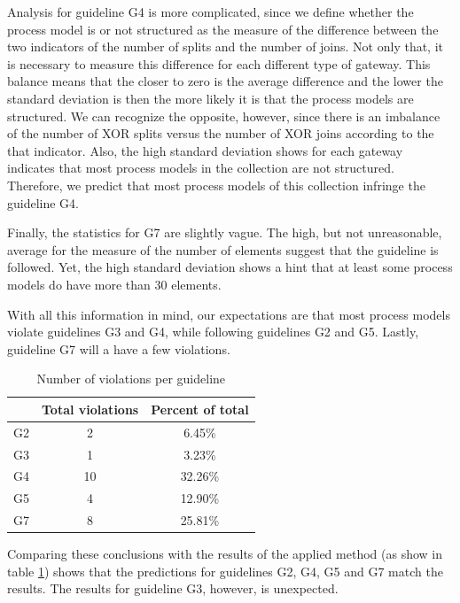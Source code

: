 \documentclass[a4paper,twoside]{article}
\begin{document}
Analysis for guideline G4 is more complicated, since we define whether the process model is or not structured as the measure of the difference between the two indicators of the number of splits and the number of joins. Not only that, it is necessary to measure this difference for each different type of gateway. This balance means that the closer to zero is the average difference and the lower the standard deviation is then the more likely it is that the process models are structured.  We can recognize the opposite, however, since there is an imbalance of the number of XOR splits versus the number of XOR joins according to the that indicator. Also, the high standard deviation shows for each gateway indicates that most process models in the collection are not structured. Therefore, we predict that most process models of this collection infringe the guideline G4.

Finally, the statistics for G7 are slightly vague. The high, but not unreasonable, average for the measure of the number of elements suggest that the guideline is followed. Yet, the high standard deviation shows a hint that at least some process models do have more than 30 elements.

With all this information in mind, our expectations are that most process models violate guidelines G3 and G4, while following guidelines G2 and G5. Lastly, guideline G7 will a have a few violations.

\begin{table}[]
	\centering
	\caption{Number of violations per guideline}
	\label{ViolationsPerGuideline}
	\begin{tabular}{|c|c|c|}
		\hline
		& Total violations & Percent of total \\ \hline
		G2 & 2 & 6.45\% \\ \hline
		G3 & 1 & 3.23\% \\ \hline
		G4 & 10 & 32.26\% \\ \hline %
		G5 & 4 & 12.90\% \\ \hline
		G7 & 8 & 25.81\% \\ \hline
	\end{tabular}
\end{table}


Comparing these conclusions with the results of the applied method (as show in table \ref{ViolationsPerGuideline}) shows that the predictions for guidelines G2, G4, G5 and G7 match the results. The results for guideline G3, however, is unexpected. 
\end{document}
